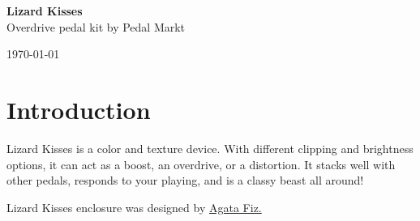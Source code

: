 \documentclass[a4paper,12pt]{article}
\begin{document}
\begin{titlepage}
  \begin{center}
    \Large\textbf{Lizard Kisses}\\
    \large{Overdrive pedal kit by Pedal Markt}
  \end{center}
  \vspace*{\fill}
  \begin{center}
    \today
  \end{center}
\end{titlepage}

\tableofcontents
\pagebreak

\section{Introduction}
Lizard Kisses is a color and texture device. With different
clipping and brightness options, it can act as a boost, an
overdrive, or a distortion. It stacks well with other pedals,
responds to your playing, and is a classy beast all around!

Lizard Kisses enclosure was designed by \href{https://fiz.gallery/}{Agata Fiz.}
\end{document}
